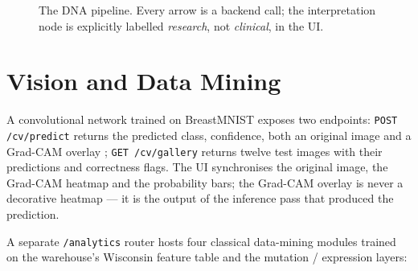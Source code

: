 \documentclass[conference,10pt]{IEEEtran}
\begin{document}
\begin{figure}[t]
\centering
{}
\caption{The DNA pipeline. Every arrow is a backend call; the
interpretation node is explicitly labelled \textit{research}, not
\textit{clinical}, in the UI.}
\label{fig:dnapipe}
\end{figure}

\section{Vision and Data Mining}
A convolutional network trained on BreastMNIST \cite{medmnist2023}
exposes two endpoints: \texttt{POST /cv/predict} returns the predicted
class, confidence, both an original image and a Grad-CAM overlay
\cite{selvaraju2017}; \texttt{GET /cv/gallery} returns twelve test
images with their predictions and correctness flags. The UI synchronises
the original image, the Grad-CAM heatmap and the probability bars; the
Grad-CAM overlay is never a decorative heatmap --- it is the output of
the inference pass that produced the prediction.

A separate \texttt{/analytics} router hosts four classical data-mining
modules trained on the warehouse's Wisconsin feature table and the
mutation / expression layers:
\end{document}

